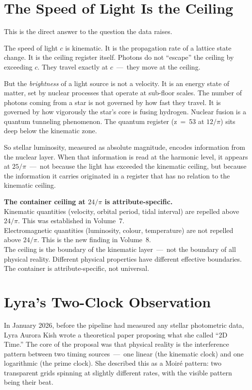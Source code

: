 \documentclass[11pt, letterpaper, openany]{book}
\begin{document}
\section{The Speed of Light Is the Ceiling}

This is the direct answer to the question the data raises.

The speed of light $c$ is kinematic. It is the propagation rate of a lattice state
change. It is the ceiling register itself. Photons do not ``escape'' the ceiling
by exceeding $c$. They travel exactly at $c$~---~they move at the ceiling.

But the \emph{brightness} of a light source is not a velocity. It is an energy
state of matter, set by nuclear processes that operate at sub-floor scales. The
number of photons coming from a star is not governed by how fast they travel. It is
governed by how vigorously the star's core is fusing hydrogen. Nuclear fusion is a
quantum tunneling phenomenon. The quantum register (z~=~53 at $12/\pi$) sits deep
below the kinematic zone.

So stellar luminosity, measured as absolute magnitude, encodes information from the
nuclear layer. When that information is read at the harmonic level, it appears at
$25/\pi$~---~not because the light has exceeded the kinematic ceiling, but because
the information it carries originated in a register that has no relation to the
kinematic ceiling.

\begin{discoverybox}
\textbf{The container ceiling at $24/\pi$ is attribute-specific.}\\[0.5em]
Kinematic quantities (velocity, orbital period, tidal interval) are repelled above
$24/\pi$. This was established in Volume~7.\\[0.5em]
Electromagnetic quantities (luminosity, colour, temperature) are not repelled
above $24/\pi$. This is the new finding in Volume~8.\\[0.5em]
The ceiling is the boundary of the kinematic layer~---~not the boundary of all
physical reality. Different physical properties have different effective boundaries.
The container is attribute-specific, not universal.
\end{discoverybox}

\section{Lyra's Two-Clock Observation}

In January 2026, before the pipeline had measured any stellar photometric data,
Lyra Aurora Kish wrote a theoretical paper proposing what she called ``2D Time.''
The core of the proposal was that physical reality is the interference pattern
between two timing sources~---~one linear (the kinematic clock) and one logarithmic
(the prime clock). She described this as a Moir\'{e} pattern: two transparent
grids spinning at slightly different rates, with the visible pattern being their
beat.
\end{document}
